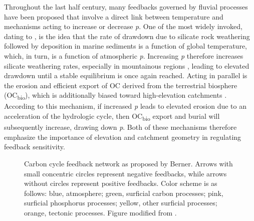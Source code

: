 Throughout the last half century, many feedbacks governed by fluvial processes have been proposed that involve a direct link between temperature and mechanisms acting to increase or decrease \textit{p}. One of the most widely invoked, dating to \citet{Walker:1981wn}, is the idea that the rate of  drawdown due to silicate rock weathering followed by  deposition in marine sediments is a function of global temperature, which, in turn, is a function of atmospheric \textit{p}. Increasing \textit{p} therefore increases silicate weathering rates, especially in mountainous regions \citep{Maher:2014kq}, leading to elevated  drawdown until a stable equilibrium is once again reached. Acting in parallel is the erosion and efficient export of OC derived from the terrestrial biosphere (OC\textsubscript{bio}), which is additionally biased toward high-elevation catchments \citep{FranceLanord:1997ua,Galy:2007ev,Hilton:2008fo,Galy:2015fx}. According to this mechanism, if increased \textit{p} leads to elevated erosion due to an acceleration of the hydrologic cycle, then OC\textsubscript{bio} export and burial will subsequently increase, drawing down \textit{p}. Both of these mechanisms therefore emphasize the importance of elevation and catchment geometry in regulating feedback sensitivity.

\begin{figure}[h]
	\caption[Carbon cycle feedback network \textit{a la} Berner]{Carbon cycle feedback network as proposed by Berner. Arrows with small concentric circles represent negative feedbacks, while arrows without circles represent positive feedbacks. Color scheme is as follows: blue, atmosphere; green, surficial carbon processes; pink, surficial phosphorus processes; yellow, other surficial processes; orange, tectonic processes. Figure modified from \citet{Berner:1999wj}.}
	\label{Ch7Fig:1}
\end{figure}


